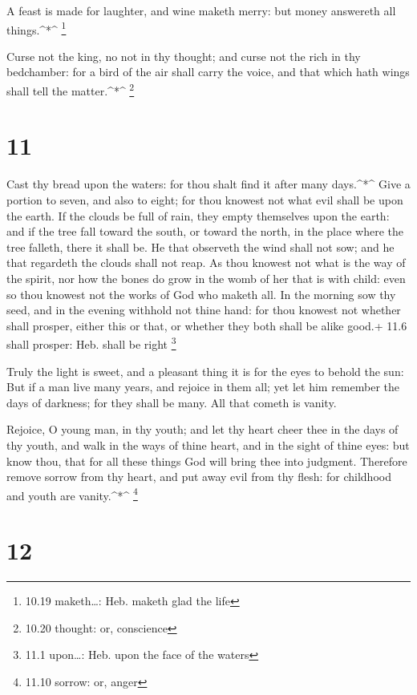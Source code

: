  A feast is made for laughter, and wine maketh merry: but
money answereth all things.\^{}*\^{} \footnote{10.19 maketh\ldots: Heb.
  maketh glad the life}

 Curse not the king, no not in thy thought; and curse not
the rich in thy bedchamber: for a bird of the air shall carry the voice,
and that which hath wings shall tell the matter.\^{}*\^{} \footnote{10.20
  thought: or, conscience}

\hypertarget{section-10}{%
\section{11}\label{section-10}}

 Cast thy bread upon the waters: for thou shalt find it
after many days.\^{}*\^{}  Give a portion to seven, and also
to eight; for thou knowest not what evil shall be upon the earth.
 If the clouds be full of rain, they empty themselves upon
the earth: and if the tree fall toward the south, or toward the north,
in the place where the tree falleth, there it shall be.  He
that observeth the wind shall not sow; and he that regardeth the clouds
shall not reap.  As thou knowest not what is the way of the
spirit, nor how the bones do grow in the womb of her that is with child:
even so thou knowest not the works of God who maketh all. 
In the morning sow thy seed, and in the evening withhold not thine hand:
for thou knowest not whether shall prosper, either this or that, or
whether they both shall be alike good.+ 11.6 shall prosper: Heb. shall
be right \footnote{11.1 upon\ldots: Heb. upon the face of the waters}

 Truly the light is sweet, and a pleasant thing it is for
the eyes to behold the sun:  But if a man live many years,
and rejoice in them all; yet let him remember the days of darkness; for
they shall be many. All that cometh is vanity.

 Rejoice, O young man, in thy youth; and let thy heart cheer
thee in the days of thy youth, and walk in the ways of thine heart, and
in the sight of thine eyes: but know thou, that for all these things God
will bring thee into judgment.  Therefore remove sorrow
from thy heart, and put away evil from thy flesh: for childhood and
youth are vanity.\^{}*\^{} \footnote{11.10 sorrow: or, anger}

\hypertarget{section-11}{%
\section{12}\label{section-11}}

